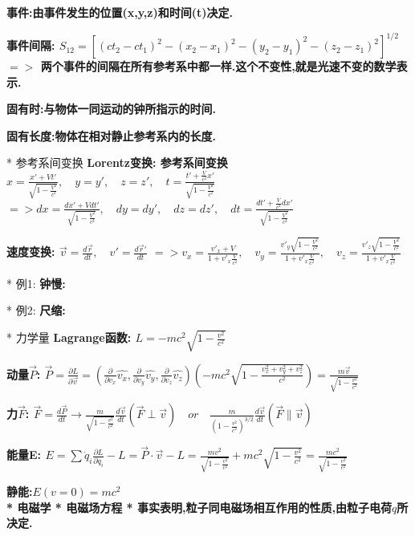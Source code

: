         \bf{事件}:由事件发生的位置(x,y,z)和时间(t)决定.
        
        \bf{事件间隔}:
            $S_{12} = [(ct_2-ct_1)^2 - (x_2-x_1)^2 - (y_2-y_1)^2 - (z_2-z_1)^2]^{1/2}$
            $ =>$ 两个事件的间隔在所有参考系中都一样.\quad 这个不变性,就是光速不变的数学表示.
        
        \bf{固有时}:与物体一同运动的钟所指示的时间.
        
        \bf{固有长度}:物体在相对静止参考系内的长度.


    * 参考系间变换
        \bf{Lorentz变换}: 参考系间变换
            $ x = \frac{x' + V t'}{\sqrt{1 - \frac{V^2}{c^2}}},\quad y=y',\quad z=z', \quad t = \frac{t'+ \frac{V}{c^2}x'}{\sqrt{1 - \frac{V^2}{c^2}}}$
            $ => dx = \frac{dx' + V dt'}{\sqrt{1 - \frac{V^2}{c^2}}},\quad dy=dy',\quad dz=dz', \quad dt = \frac{dt'+ \frac{V}{c^2}dx'}{\sqrt{1 - \frac{V^2}{c^2}}}$
    
        \bf{速度变换}: $\vec v = \frac{d\vec r}{dt},\quad v' = \frac{d\vec r'}{dt}$
            $ => v_x = \frac{v'_x + V}{1 + v'_x \frac{V}{c^2}}, \quad v_y = \frac{v'_y \sqrt{1 - \frac{V^2}{c^2}}}{1 + v'_x \frac{V}{c^2}},\quad v_z = \frac{v'_z \sqrt{1 - \frac{V^2}{c^2}}}{1 + v'_x \frac{V}{c^2}}$
            
        * 例1: \bf{钟慢}:
    
        * 例2: \bf{尺缩}:


    * 力学量
        \bf{Lagrange函数}:
            $L = -m c^2 \sqrt{1 - \frac{v^2}{c^2}}$
    
        \bf{动量$\vec P$}:
            $\vec P = \frac{∂ L}{∂ \vec v}= (\frac{∂}{∂ v_x} \hat{v_x}, \frac{∂}{∂ v_y} \hat{v_y}, \frac{∂}{∂ v_z} \hat{v_z})(-m c^2 \sqrt{1 - \frac{v_x^2 + v_y^2 + v_z^2}{c^2}}) = \frac{m \vec v}{\sqrt{1 - \frac{v^2}{c^2}}}$
        
        \bf{力$\vec F$}:
            $\vec F = \frac{d\vec P}{dt} \to \frac{m}{\sqrt{1 - \frac{v^2}{c^2}}} \frac{d\vec v}{dt}(\vec F \perp \vec v) \quad or\quad  \frac{m}{(1 - \frac{v^2}{c^2})^{3/2}} \frac{d\vec v}{dt} (\vec F \parallel \vec v)$
    
        \bf{能量E}:
            $E = \sum \dot q_i \frac{∂ L}{∂ \dot q_i} - L = \vec P \cdot \vec v - L = \frac{m v^2}{\sqrt{1 - \frac{v^2}{c^2}}} + m c^2 \sqrt{1 - \frac{v^2}{c^2}} = \frac{mc^2}{\sqrt{1 - \frac{v^2}{c^2}}}$
    
        \bf{静能}:\quad $E(v=0) = m c^2$\\


* 电磁学
    * 电磁场方程
        * 事实表明,粒子同电磁场相互作用的性质,由粒子电荷$q$所决定.
    
